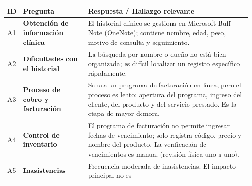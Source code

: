 \documentclass[
]{article}
\newcounter{none} %
\begin{document}
{\def\LTcaptype{none} %
\begin{longtable}[]{|
  >{\centering\arraybackslash}p{}|
  >{\raggedright\arraybackslash}p{}|
  >{\raggedright\arraybackslash}p{}|}
\hline
\begin{minipage}[b]{\linewidth}\centering
\textbf{ID}
\end{minipage} & \begin{minipage}[b]{\linewidth}\centering
\textbf{Pregunta}
\end{minipage} & \begin{minipage}[b]{\linewidth}\raggedright
\textbf{Respuesta / Hallazgo relevante}
\end{minipage} \\
\hline
\endhead
\hline
\endlastfoot
A1 & \textbf{Obtención de información clínica} &
\begin{minipage}[t]{\linewidth}\raggedright
El historial clínico se gestiona en Microsoft Buff Note (OneNote);
contiene nombre, edad, peso, motivo de consulta y seguimiento.
\end{minipage} \\
\hline
A2 & \textbf{Dificultades con el historial} &
\begin{minipage}[t]{\linewidth}\raggedright
La búsqueda por nombre o dueño no está bien organizada; es difícil
localizar un registro específico rápidamente.
\end{minipage} \\
\hline
A3 & \textbf{Proceso de cobro y facturación} &
\begin{minipage}[t]{\linewidth}\raggedright
Se usa un programa de facturación en línea, pero el proceso es lento:
apertura del programa, ingreso del cliente, del producto y del servicio
prestado. Es la etapa de mayor demora.
\end{minipage} \\
\hline
A4 & \textbf{Control de inventario} &
\begin{minipage}[t]{\linewidth}\raggedright
El programa de facturación no permite ingresar fechas de vencimiento;
solo registra código, precio y nombre del producto. La verificación de
vencimientos es manual (revisión física uno a uno).
\end{minipage} \\
\hline
A5 & \textbf{Inasistencias} &
\begin{minipage}[t]{\linewidth}\raggedright
Frecuencia moderada de inasistencias. El impacto principal no es

\end{minipage}
\end{longtable}}
\end{document}
